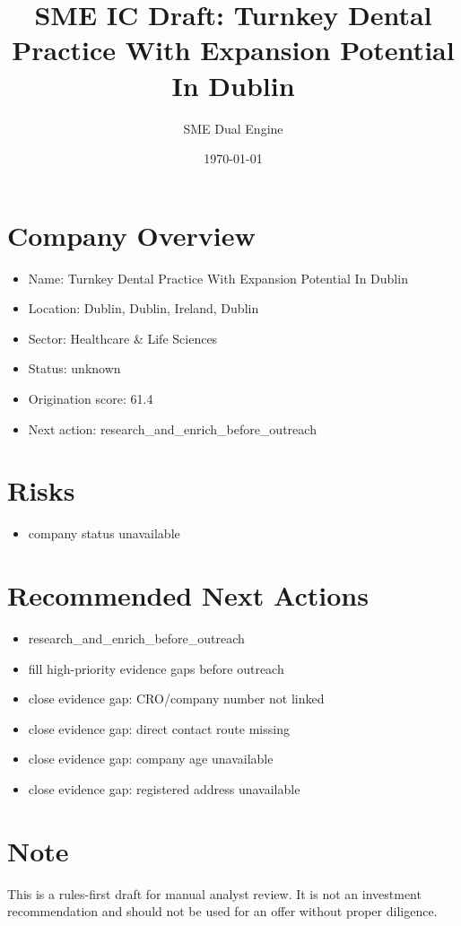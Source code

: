 \documentclass[11pt,a4paper]{article}
\title{SME IC Draft: Turnkey Dental Practice With Expansion Potential In Dublin}
\author{SME Dual Engine}
\date{\today}
\begin{document}
\maketitle
\section*{Company Overview}
\begin{itemize}[leftmargin=1.4em]
\item Name: Turnkey Dental Practice With Expansion Potential In Dublin
\item Location: Dublin, Dublin, Ireland, Dublin
\item Sector: Healthcare \& Life Sciences
\item Status: unknown
\item Origination score: 61.4
\item Next action: research\_and\_enrich\_before\_outreach
\end{itemize}
\section*{Risks}
\begin{itemize}[leftmargin=1.4em]
\item company status unavailable
\end{itemize}
\section*{Recommended Next Actions}
\begin{itemize}[leftmargin=1.4em]
\item research\_and\_enrich\_before\_outreach
\item fill high-priority evidence gaps before outreach
\item close evidence gap: CRO/company number not linked
\item close evidence gap: direct contact route missing
\item close evidence gap: company age unavailable
\item close evidence gap: registered address unavailable
\end{itemize}
\section*{Note}
This is a rules-first draft for manual analyst review. It is not an investment
recommendation and should not be used for an offer without proper diligence.
\end{document}

